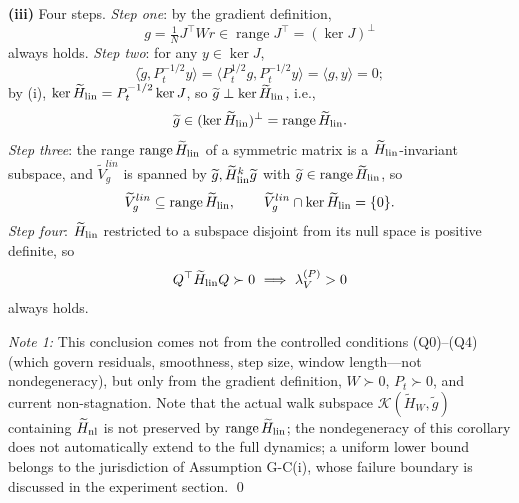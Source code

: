 \documentclass[11pt]{article}
\newcommand{\W}{W}
\newcommand{\wt}[1]{\widetilde{#1}}
\numberwithin{equation}{section}
\begin{document}
\noindent\textbf{(iii)} Four steps. \emph{Step one}: by the gradient definition,
\begin{equation}
g=\tfrac1N J^\top\W r\in\operatorname{range}J^\top=(\ker J)^\perp
\end{equation}
always holds. \emph{Step two}: for any $y\in\ker J$,
\begin{equation}
\langle\wt g,P_t^{-1/2}y\rangle
=\langle P_t^{1/2}g,P_t^{-1/2}y\rangle
=\langle g,y\rangle=0;
\end{equation}
by (i), $\ker\wt H_{\rm lin}=P_t^{-1/2}\ker J$, so $\wt g\perp\ker\wt H_{\rm lin}$, i.e.,
\begin{equation}
\wt g\in(\ker\wt H_{\rm lin})^\perp=\operatorname{range}\wt H_{\rm lin}.
\end{equation}
\emph{Step three}: the range $\operatorname{range}\wt H_{\rm lin}$ of a symmetric matrix is a $\wt H_{\rm lin}$-invariant subspace, and $\wt V_g^{lin}$ is spanned by $\wt g,\wt H_{\rm lin}^k\wt g$ with $\wt g\in\operatorname{range}\wt H_{\rm lin}$, so
\begin{equation}
\wt V_g^{lin}\subseteq\operatorname{range}\wt H_{\rm lin},\qquad
\wt V_g^{lin}\cap\ker\wt H_{\rm lin}=\{0\}.
\end{equation}
\emph{Step four}: $\wt H_{\rm lin}$ restricted to a subspace disjoint from its null space is positive definite, so
\begin{equation}
Q^\top\wt H_{\rm lin}Q\succ0\ \Longrightarrow\ \lambda_V^{(P)}>0
\end{equation}
always holds.

\noindent\emph{Note 1:} This conclusion comes not from the controlled conditions (Q0)--(Q4) (which govern residuals, smoothness, step size, window length---not nondegeneracy), but only from the gradient definition, $\W\succ0$, $P_t\succ0$, and current non-stagnation. Note that the actual walk subspace $\mathcal K(\wt H_{\W},\wt g)$ containing $\wt H_{\rm nl}$ is not preserved by $\operatorname{range}\wt H_{\rm lin}$; the nondegeneracy of this corollary does not automatically extend to the full dynamics; a uniform lower bound belongs to the jurisdiction of Assumption G-C(i), whose failure boundary is discussed in the experiment section. \qed
\end{document}
